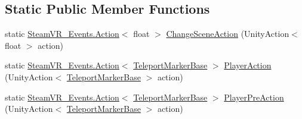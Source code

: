 \subsection*{Static Public Member Functions}
\begin{DoxyCompactItemize}
\item 
static \mbox{\hyperlink{class_valve_1_1_v_r_1_1_steam_v_r___events_1_1_action}{Steam\+V\+R\+\_\+\+Events.\+Action}}$<$ float $>$ \mbox{\hyperlink{class_valve_1_1_v_r_1_1_interaction_system_1_1_teleport_a28823c5a8399c339e777276f21a263bf}{Change\+Scene\+Action}} (Unity\+Action$<$ float $>$ action)
\item 
static \mbox{\hyperlink{class_valve_1_1_v_r_1_1_steam_v_r___events_1_1_action}{Steam\+V\+R\+\_\+\+Events.\+Action}}$<$ \mbox{\hyperlink{class_valve_1_1_v_r_1_1_interaction_system_1_1_teleport_marker_base}{Teleport\+Marker\+Base}} $>$ \mbox{\hyperlink{class_valve_1_1_v_r_1_1_interaction_system_1_1_teleport_af697fd146fb173c1aac1a7502d9bc320}{Player\+Action}} (Unity\+Action$<$ \mbox{\hyperlink{class_valve_1_1_v_r_1_1_interaction_system_1_1_teleport_marker_base}{Teleport\+Marker\+Base}} $>$ action)
\item 
static \mbox{\hyperlink{class_valve_1_1_v_r_1_1_steam_v_r___events_1_1_action}{Steam\+V\+R\+\_\+\+Events.\+Action}}$<$ \mbox{\hyperlink{class_valve_1_1_v_r_1_1_interaction_system_1_1_teleport_marker_base}{Teleport\+Marker\+Base}} $>$ \mbox{\hyperlink{class_valve_1_1_v_r_1_1_interaction_system_1_1_teleport_add8684ac5cd745c1ffdad09778d4b85b}{Player\+Pre\+Action}} (Unity\+Action$<$ \mbox{\hyperlink{class_valve_1_1_v_r_1_1_interaction_system_1_1_teleport_marker_base}{Teleport\+Marker\+Base}} $>$ action)
\end{DoxyCompactItemize}
